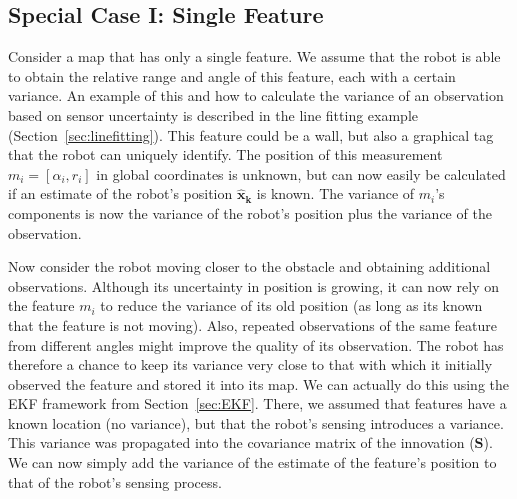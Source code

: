 \documentclass[paper=6.14in:9.21in,pagesize=pdftex,11pt,twoside,openright]{scrbook}
\begin{document}
\subsection{Special Case I: Single Feature}
Consider a map that has only a single feature. We assume that the robot is able to obtain the relative range and angle of this feature, each with a certain variance. An example of this and how to calculate the variance of an observation based on sensor uncertainty is described in the line fitting example (Section~\ref{sec:linefitting}). This feature could be a wall, but also a graphical tag that the robot can uniquely identify. The position of this measurement $m_i=[\alpha_i,r_i]$  in global coordinates is unknown, but can now easily be calculated if an estimate of the robot's position $\boldsymbol{\hat{x}_k}$ is known.  The variance of $ m_i$'s components is now the variance of the robot's position plus the variance of the observation.

Now consider the robot moving closer to the obstacle and obtaining additional observations. Although its uncertainty in position is growing, it can now rely on the feature $m_i$ to reduce the variance of its old position (as long as its known that the feature is not moving). Also, repeated observations of the same feature from different angles might improve the quality of its observation. The robot has therefore a chance to keep its variance very close to that with which it initially observed the feature and stored it into its map. We can actually do this using the EKF framework from Section~\ref{sec:EKF}. There, we assumed that features have a known location (no variance), but that the robot's sensing introduces a variance. This variance was propagated into the covariance matrix of the innovation ($ \boldsymbol{S}$). We can now simply add the variance of the estimate of the feature's position to that of the robot's sensing process.
\end{document}
